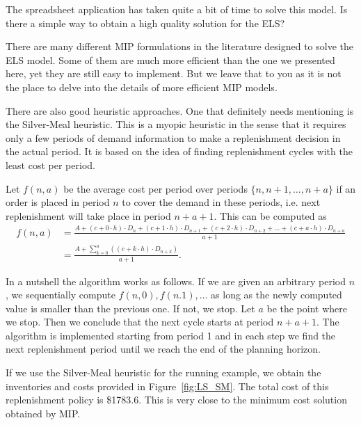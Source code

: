 \begin{exercise}
The spreadsheet application has taken quite a bit of time to solve this model. Is there a simple way to obtain a high quality solution for the ELS?


\begin{solution}
There are many different MIP formulations in the literature designed to solve the ELS model. Some of them are much more efficient than the one we presented here, yet they are still easy to implement. But we leave that to you as it is not the place to delve into the details of more efficient MIP models.

There are also good heuristic approaches. One that definitely needs mentioning is the Silver-Meal heuristic. This is a myopic heuristic in the sense that it requires only a few periods of demand information to make a replenishment decision in the actual period. It is based on the idea of finding replenishment cycles with the least cost per period. 

Let $f(n,a)$ be the average cost per period over periods $\{n,n+1,\ldots,n+a\}$ if an order is placed in period $n$ to cover the demand in these periods, i.e. next replenishment will take place in period $n+a+1$. This can be computed as
\begin{align*}
f(n,a) 
& = \frac{A + (c+0\cdot h) \cdot D_{n} + (c+1\cdot h)\cdot D_{n+1} + (c+2\cdot h)\cdot D_{n+2} + \ldots + (c+a\cdot h)\cdot D_{n+a}}{a+1} \\
& = \frac{A + \sum_{k=0}^a \left((c+k\cdot h)\cdot D_{n+k}\right)}{a+1}.
\end{align*}

In a nutshell the algorithm works as follows. If we are given an arbitrary period $n$, we sequentially compute $f(n,0),f(n.1),\ldots$ as long as the newly computed value is smaller than the previous one. If not, we stop. Let $a$ be the point where we stop. Then we conclude that the next cycle starts at period $n+a+1$. The algorithm is implemented starting from period 1 and in each step we find the next replenishment period until we reach the end of the planning horizon.

If we use the Silver-Meal heuristic for the running example, we obtain the inventories and costs provided in Figure~\ref{fig:LS_SM}. The total cost of this replenishment policy is \$1783.6. This is very close to the minimum cost solution obtained by MIP. 
 
\end{solution}
\end{exercise}

